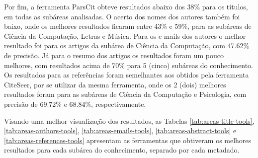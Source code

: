 Por fim, a ferramenta ParsCit obteve resultados abaixo dos 38\% para os títulos, em todas as subáreas analisadas. O acerto dos nomes dos autores também foi baixo, onde os melhores resultados ficaram entre 43\% e 59\%, para as subáreas de Ciência da Computação, Letras e Música. Para os e-mails dos autores o melhor resultado foi para os artigos da subárea de Ciência da Computação, com 47.62\% de precisão. Já para o resumo dos artigos os resultados foram um pouco melhores, com resultados acima de 70\% para 5 (cinco) subáreas do conhecimento. Os resultados para as referências foram semelhantes aos obtidos pela ferramenta CiteSeer, por se utilizar da mesma ferramenta, onde os 2 (dois) melhores resultados foram para as subáreas de Ciência da Computação e Psicologia, com precisão de 69.72\% e 68.84\%, respectivamente.

Visando uma melhor visualização dos resultados, as Tabelas \ref{tab:areas-title-tools}, \ref{tab:areas-authors-tools}, \ref{tab:areas-emails-tools}, \ref{tab:areas-abstract-tools} e \ref{tab:areas-references-tools} apresentam as ferramentas que obtiveram os melhores resultados para cada subárea do conhecimento, separado por cada metadado. 

